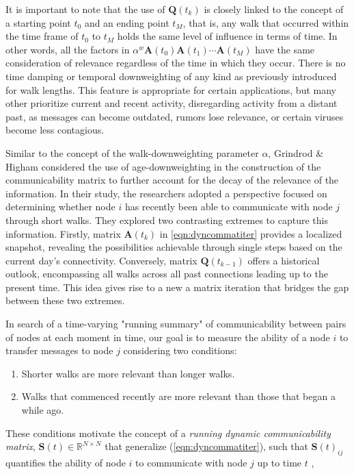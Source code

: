 It is important to note that the use of $\mathbf{Q}(t_k)$ is closely linked to the concept of a starting point $t_0$ and an ending point $t_M$, that is, any walk that occurred within the time frame of $t_0$ to $t_M$ holds the same level of influence in terms of time. In other words, all the factors in $\alpha^w\mathbf{A}(t_{0})\mathbf{A}(t_{1})\cdots \mathbf{A}(t_{M})$ have the same consideration of relevance regardless of the time in which they occur. There is no time damping or temporal downweighting of any kind as previously introduced for walk lengths. This feature is appropriate for certain applications, but many other prioritize current and recent activity, disregarding activity from a distant past, as messages can become outdated, rumors lose relevance, or certain viruses become less contagious. 

Similar to the concept of the walk-downweighting parameter $\alpha$, Grindrod \& Higham \cite{grindrod2013matrix} considered the use of age-downweighting in the construction of the communicability matrix to further account for the decay of the relevance of the information. In their study, the researchers adopted a perspective focused on determining whether node $i$ has recently been able to communicate with node $j$ through short walks. They explored two contrasting extremes to capture this information. Firstly, matrix $\mathbf{A}(t_k)$ in \eqref{eqn:dyncommatiter} provides a localized snapshot, revealing the possibilities achievable through single steps based on the current day's connectivity. Conversely, matrix $\mathbf{Q}(t_{k-1})$ offers a historical outlook, encompassing all walks across all past connections leading up to the present time. This idea gives rise to a new a matrix iteration that bridges the gap between these two extremes.

In search of a time-varying "running summary" of communicability between pairs of nodes at each moment in time, our goal is to measure the ability of a node $i$ to transfer messages to node $j$ considering two conditions: 
\begin{enumerate}[label=(\roman*)]
  \item Shorter walks are more relevant than longer walks.
  \item Walks that commenced recently are more relevant than those that began a while ago.
\end{enumerate}

 These conditions motivate the concept of a \textit{running dynamic communicability matrix}, $\mathbf{S}(t)\in\mathbb{R}^{N\times N}$ that generalize (\ref{eqn:dyncommatiter}), such that $\mathbf{S}(t)_{ij}$ quantifies the ability of node $i$ to communicate with node $j$ up to time $t$ \cite{grindrod2013matrix},
 
